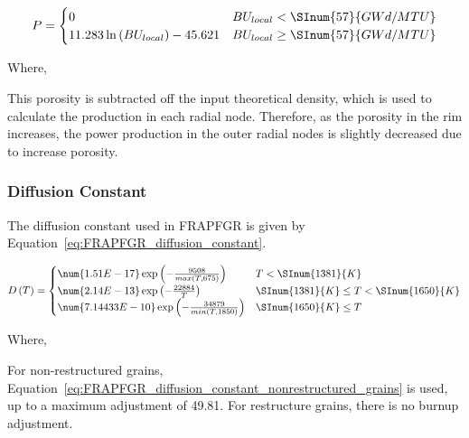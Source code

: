 \begin{equation}
    P = \begin{cases}
        0                                          &  BU_{local} < \SInum{57}{GWd/MTU}  \\
        11.283 \ln \left( BU_{local}\right)-45.621 & BU_{local} \geq \SInum{57}{GWd/MTU}
    \end{cases}
\end{equation}

Where,

This porosity is subtracted off the input theoretical density, which is used to calculate the
production in each radial node. Therefore, as the porosity in the rim increases, the power
production in the outer radial nodes is slightly decreased due to increase porosity.

\subsubsection{Diffusion Constant}\label{diffusion-constant-1}

The diffusion constant used in FRAPFGR is given by Equation~\ref{eq:FRAPFGR_diffusion_constant}.

\begin{equation}
    \label{eq:FRAPFGR_diffusion_constant}
    D \left( T \right) =
    \begin{cases}
        \num{1.51E- 17}\exp\left(- \frac{9508}{max(T,675)}\right)   & T < \SInum{1381}{K}                   \\
        \num{2.14E- 13}\exp\left(- \frac{22884}{T}\right)           & \SInum{1381}{K} \leq T < \SInum{1650}{K} \\
        \num{7.14433E- 10}\exp\left(-\frac{34879}{min(T,1850)}\right)    & \SInum{1650}{K} \leq T
    \end{cases}
\end{equation}

Where,

For non-restructured grains, Equation~\ref{eq:FRAPFGR_diffusion_constant_nonrestructured_grains} is used, up to a maximum
adjustment of 49.81. For restructure grains, there is no burnup
adjustment.

